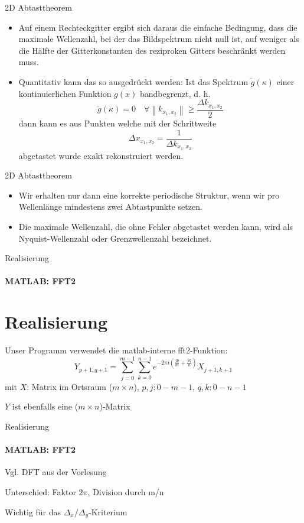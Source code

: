 \documentclass{beamer}
\begin{document}
	\begin{frame}{2D Abtasttheorem}
	\begin{itemize}
		\item Auf einem Rechteckgitter ergibt sich daraus die einfache Bedingung,	dass die maximale Wellenzahl, bei der das Bildspektrum nicht null ist,
		auf weniger als die Hälfte der Gitterkonstanten des reziproken Gitters beschränkt werden muss.
		\item Quantitativ kann das so ausgedrückt werden: Ist das Spektrum $\tilde{g}(\kappa)$ einer kontinuierlichen Funktion $g(x)$ bandbegrenzt, d. h.
		$$\tilde{g}(\kappa) = 0 \hspace{1em} \forall \left\|k_{x_1,x_2}\right\|\ge \frac{\Delta k_{x_1,x_2}}{2} $$
		dann kann es aus Punkten welche mit der Schrittweite
		$$\Delta x_{x_1,x_2} = \frac{1}{\Delta k_{x_1,x_2}} $$
		abgetastet wurde exakt rekonstruiert werden.\cite{bildverarbeitung}
	\end{itemize}
	\end{frame}

	\begin{frame}{2D Abtasttheorem}
	\begin{itemize}
		\item Wir erhalten nur dann eine korrekte periodische
		Struktur, wenn wir pro Wellenlänge mindestens zwei Abtastpunkte setzen.
		\item Die maximale Wellenzahl, die ohne Fehler abgetastet werden kann, wird als	Nyquist-Wellenzahl oder Grenzwellenzahl bezeichnet.
	\end{itemize}
	\end{frame}
	
	\begin{frame}{Realisierung}
	\framesubtitle{MATLAB: FFT2}
	\section{Realisierung}	
	Unser Programm verwendet die matlab-interne fft2-Funktion:
	$$Y_{p+1,q+1} = \sum_{j=0}^{m-1}\sum_{k=0}^{n-1}e^{-2\pi i(\frac{jp}{m}+\frac{kq}{n})}X_{j+1,k+1}$$ mit $X$: Matrix im Ortsraum ($m\times n$), $p,j: 0 - m-1$, $q,k: 0 - n-1$

	$Y$ ist ebenfalls eine ($m\times n$)-Matrix
	\end{frame}
	\begin{frame}{Realisierung}
	\framesubtitle{MATLAB: FFT2}
	Vgl. DFT aus der Vorlesung
	
	Unterschied: Faktor $2\pi$, Division durch m/n
	
	Wichtig für das $\Delta_x / \Delta_y$-Kriterium
	\end{frame}
	
\end{document}
